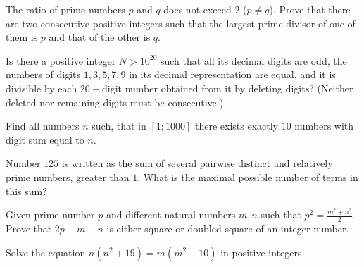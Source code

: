 \documentclass[problems.tex]{subfile}
\begin{document}
	
	
	\begin{problem}
		The ratio of prime numbers $p$ and $q$ does not exceed $2$ ($p \neq q$). Prove
		that there are two consecutive positive integers such that the largest
		prime divisor of one of them is $p$ and that of the other is $q$.
	\end{problem}
	
	
	\begin{problem}
		Is there a positive integer $N > 10^{20}$ such that all its decimal digits
		are odd, the numbers of digits $1, 3, 5, 7, 9$ in its decimal representation
		are equal, and it is divisible by each $20-$digit number obtained from it by
		deleting digits? (Neither deleted nor remaining digits must be consecutive.)
	\end{problem}
	
	
	
	
	\begin{problem}
		Find all numbers $n$ such, that in $[1;1000]$ there exists exactly $10$ numbers with digit sum equal to $n$. %
	\end{problem}
	
	
	
	\begin{problem}
		Number $125$ is written as the sum of several pairwise distinct and relatively prime numbers, greater than $1$. What is the maximal possible number of terms in this sum? %
	\end{problem}
	
	
	
	\begin{problem}
		Given prime number $p$ and different natural numbers $m, n$ such that $p^2=\frac{m^2+n^2}{2}$. Prove that $2p-m-n$ is either square or doubled square of an integer number. %
	\end{problem}
	
	
	
	
	\begin{problem}
		Solve the equation $n(n^2+19)=m(m^2-10)$ in positive integers. %
	\end{problem}
	
\end{document}
